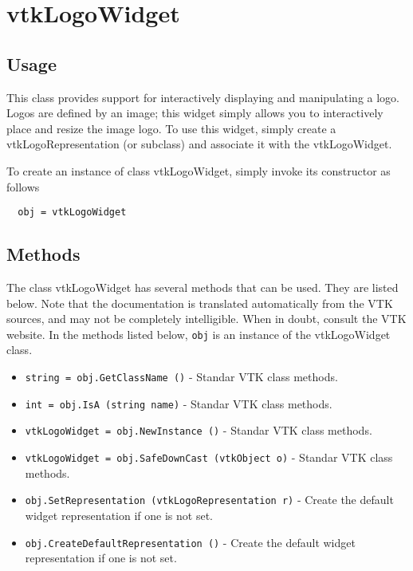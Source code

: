 \section{vtkLogoWidget}

\subsection{Usage}

 This class provides support for interactively displaying and manipulating
 a logo. Logos are defined by an image; this widget simply allows you to
 interactively place and resize the image logo. To use this widget, simply
 create a vtkLogoRepresentation (or subclass) and associate it with the
 vtkLogoWidget.

To create an instance of class vtkLogoWidget, simply
invoke its constructor as follows
\begin{verbatim}
  obj = vtkLogoWidget
\end{verbatim}
\subsection{Methods}

The class vtkLogoWidget has several methods that can be used.
  They are listed below.
Note that the documentation is translated automatically from the VTK sources,
and may not be completely intelligible.  When in doubt, consult the VTK website.
In the methods listed below, \verb|obj| is an instance of the vtkLogoWidget class.
\begin{itemize}
\item  \verb|string = obj.GetClassName ()| -  Standar VTK class methods.

\item  \verb|int = obj.IsA (string name)| -  Standar VTK class methods.

\item  \verb|vtkLogoWidget = obj.NewInstance ()| -  Standar VTK class methods.

\item  \verb|vtkLogoWidget = obj.SafeDownCast (vtkObject o)| -  Standar VTK class methods.

\item  \verb|obj.SetRepresentation (vtkLogoRepresentation r)| -  Create the default widget representation if one is not set. 

\item  \verb|obj.CreateDefaultRepresentation ()| -  Create the default widget representation if one is not set. 

\end{itemize}
